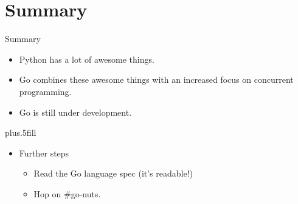 \documentclass{beamer}
\begin{document}
\section*{Summary}

\begin{frame}{Summary}

  \begin{itemize}
  \item
    Python has \alert{a lot of awesome things}.
  \item
    Go \alert{combines these awesome things} with an increased focus on concurrent programming.
  \item
    Go is still \alert{under development}.
  \end{itemize}
  
  \vskip0pt plus.5fill
  \begin{itemize}
  \item
      Further steps
    \begin{itemize}
    \item
        Read the Go language spec (it's readable!)
    \item
        Hop on \#go-nuts.
    \end{itemize}
  \end{itemize}
\end{frame}
\end{document}
